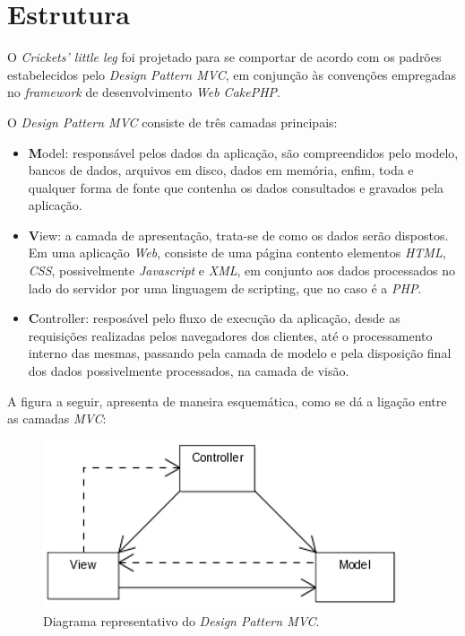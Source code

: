 \section{Estrutura}

O \textit{Crickets' little leg} foi projetado para se comportar de acordo com os padrões estabelecidos pelo \textit{Design Pattern MVC}, em conjunção às convenções empregadas no \textit{framework} de desenvolvimento \textit{Web CakePHP}.

O \textit{Design Pattern MVC} consiste de três camadas principais:
\begin{itemize}
    \item \textbf{M}odel: responsável pelos dados da aplicação, são compreendidos pelo modelo, bancos de dados, arquivos em disco, dados em memória, enfim, toda e qualquer forma de fonte que contenha os dados consultados e gravados pela aplicação.

    \item \textbf{V}iew: a camada de apresentação, trata-se de como os dados serão dispostos. Em uma aplicação \textit{Web}, consiste de uma página contento elementos \textit{HTML}, \textit{CSS}, possivelmente \textit{Javascript} e \textit{XML}, em conjunto aos dados processados no lado do servidor por uma linguagem de scripting, que no caso é a \textit{PHP}.

    \item \textbf{C}ontroller: resposável pelo fluxo de execução da aplicação, desde as requisições realizadas pelos navegadores dos clientes, até o processamento interno das mesmas, passando pela camada de modelo e pela disposição final dos dados possivelmente processados, na camada de visão.
\end{itemize}

A figura a seguir, apresenta de maneira esquemática, como se dá a ligação entre as camadas \textit{MVC}:

\clearpage
\begin{figure}[h!tp]
    \begin{center}
        \includegraphics[scale=1]{./figuras/ModelViewControllerDiagram.png}

        \caption{Diagrama representativo do \textit{Design Pattern MVC}.}
    \end{center}
\end{figure}


